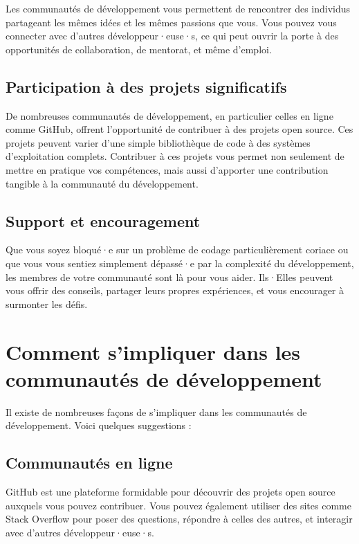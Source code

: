 Les communautés de développement vous permettent de rencontrer des individus partageant les mêmes idées et les mêmes passions que vous. Vous pouvez vous connecter avec d'autres développeur·euse·s, ce qui peut ouvrir la porte à des opportunités de collaboration, de mentorat, et même d'emploi.

\subsection{Participation à des projets significatifs}

De nombreuses communautés de développement, en particulier celles en ligne comme GitHub, offrent l'opportunité de contribuer à des projets open source. Ces projets peuvent varier d'une simple bibliothèque de code à des systèmes d'exploitation complets. Contribuer à ces projets vous permet non seulement de mettre en pratique vos compétences, mais aussi d'apporter une contribution tangible à la communauté du développement.

\subsection{Support et encouragement}

Que vous soyez bloqué·e sur un problème de codage particulièrement coriace ou que vous vous sentiez simplement dépassé·e par la complexité du développement, les membres de votre communauté sont là pour vous aider. Ils·Elles peuvent vous offrir des conseils, partager leurs propres expériences, et vous encourager à surmonter les défis.

\section{Comment s'impliquer dans les communautés de développement}

Il existe de nombreuses façons de s'impliquer dans les communautés de développement. Voici quelques suggestions :

\subsection{Communautés en ligne}

GitHub est une plateforme formidable pour découvrir des projets open source auxquels vous pouvez contribuer. Vous pouvez également utiliser des sites comme Stack Overflow pour poser des questions, répondre à celles des autres, et interagir avec d'autres développeur·euse·s.


